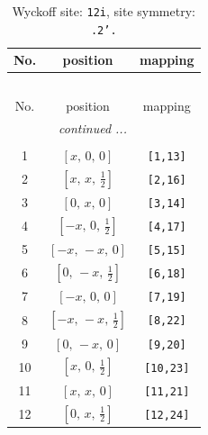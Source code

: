 \documentclass[fleqn,8pt]{jsarticle}
\begin{document}
\renewcommand{\arraystretch}{1.2}
\begin{longtable}{ccc}
\caption{Wyckoff site: {\tt 12i}, site symmetry: {\tt .2'.}}
 \\
 \hline \hline
No. & position & mapping \\ \hline \endfirsthead

\multicolumn{2}{l}{\tablename\ \thetable{}} \\
 \hline \hline
No. & position & mapping \\ \hline \endhead

 \hline \hline
\multicolumn{2}{r}{\footnotesize\it continued ...} \\ \endfoot

 \hline \hline
\multicolumn{2}{r}{} \\ \endlastfoot

1 & $\left[ x,\, 0,\, 0 \right]$ & {\tt [1,13]} \\ \hline
2 & $\left[ x,\, x,\, \frac{1}{2} \right]$ & {\tt [2,16]} \\ \hline
3 & $\left[ 0,\, x,\, 0 \right]$ & {\tt [3,14]} \\ \hline
4 & $\left[ - x,\, 0,\, \frac{1}{2} \right]$ & {\tt [4,17]} \\ \hline
5 & $\left[ - x,\, - x,\, 0 \right]$ & {\tt [5,15]} \\ \hline
6 & $\left[ 0,\, - x,\, \frac{1}{2} \right]$ & {\tt [6,18]} \\ \hline
7 & $\left[ - x,\, 0,\, 0 \right]$ & {\tt [7,19]} \\ \hline
8 & $\left[ - x,\, - x,\, \frac{1}{2} \right]$ & {\tt [8,22]} \\ \hline
9 & $\left[ 0,\, - x,\, 0 \right]$ & {\tt [9,20]} \\ \hline
10 & $\left[ x,\, 0,\, \frac{1}{2} \right]$ & {\tt [10,23]} \\ \hline
11 & $\left[ x,\, x,\, 0 \right]$ & {\tt [11,21]} \\ \hline
12 & $\left[ 0,\, x,\, \frac{1}{2} \right]$ & {\tt [12,24]} \\
\end{longtable}
\renewcommand{\arraystretch}{1.2}
\end{document}
